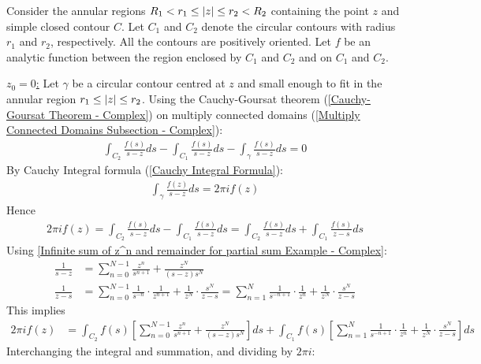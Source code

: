 \documentclass[12pt, english]{book}
\makeatletter
\renewenvironment{proof}[1][\proofname]{\par
	\pushQED{\qed}%
	\normalfont \topsep6\p@\@plus6\p@\relax
	\list{}{%
		\settowidth{\leftmargin}{\itshape\proofname:\hskip\labelsep}%
		\setlength{\labelwidth}{0pt}%
		\setlength{\itemindent}{-\leftmargin}%
	}%
	\item[\hskip\labelsep\itshape#1\@addpunct{:}]\ignorespaces
	}{ \popQED\endlist\@endpefalse}
\makeatother
\begin{document}
	\begin{proof}
		Consider the annular regions \(R_1 < r_1 \leq \abs{z} \leq r_2 < R_2\) containing the point \(z\) and simple closed contour \(C\). Let \(C_1\) and \(C_2\) denote the circular contours with radius \(r_1\) and \(r_2\), respectively. All the contours are positively oriented. Let \(f\) be an analytic function between the region enclosed by \(C_1\) and \(C_2\) and on \(C_1\) and \(C_2\).
		
		\underline{\(z_0 = 0\):} \newline
		Let \(\gamma\) be a circular contour centred at \(z\) and small enough to fit in the annular region \(r_1 \leq \abs{z} \leq r_2\). Using the Cauchy-Goursat theorem (\cref{Cauchy-Goursat Theorem - Complex}) on multiply connected domains (\cref{Multiply Connected Domains Subsection - Complex}):
		\begin{align*}
			\int_{C_2} \frac{f(s)}{s-z} ds - \int_{C_1} \frac{f(s)}{s-z} ds - \int_{\gamma} \frac{f(s)}{s-z} ds = 0
		\end{align*}
		By Cauchy Integral formula (\cref{Cauchy Integral Formula}):
		\begin{align*}
			\int_{\gamma} \frac{f(z)}{s-z} ds = 2 \pi i f(z)
 		\end{align*}
 		Hence
 		\begin{align*}
 			2 \pi i f(z) =  \int_{C_2} \frac{f(s)}{s-z} ds - \int_{C_1} \frac{f(s)}{s-z} ds
 				=  \int_{C_2} \frac{f(s)}{s-z} ds + \int_{C_1} \frac{f(s)}{z-s} ds
 		\end{align*}
 		Using \cref{Infinite sum of z^n and remainder for partial sum Example - Complex}:
 		\begin{align*}
 			\frac{1}{s-z} &= \sum_{n=0}^{N-1} \frac{z^n}{s^{n+1}} + \frac{z^N}{(s-z)s^N} \\
 			\frac{1}{z-s} &= \sum_{n=0}^{N-1} \frac{1}{s^{-n}} \cdot \frac{1}{z^{n+1}} + \frac{1}{z^N} \cdot \frac{s^N}{z-s} 
 				= \sum_{n=1}^{N} \frac{1}{s^{-n+1}} \cdot \frac{1}{z^n} + \frac{1}{z^N} \cdot \frac{s^N}{z-s} 
 		\end{align*}
 		This implies
 		\begin{align*}
 			2 \pi i  f(z) 
 			&= \int_{C_2} f(s) 
 			 \left[ \sum_{n=0}^{N-1} \frac{z^n}{s^{n+1}} + \frac{z^N}{(s-z)s^N} \right] ds 
 			 + \int_{C_1} f(s) 
 			 \left[ \sum_{n=1}^{N} \frac{1}{s^{-n+1}} \cdot \frac{1}{z^n} + \frac{1}{z^N} \cdot \frac{s^N}{z-s} \right] ds
 		\end{align*}
 		Interchanging the integral and summation, and dividing by \(2\pi i\):
 		\begin{align*}

\end{align*}
\end{proof}
\end{document}
